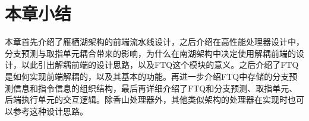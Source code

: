 









\section{本章小结}

本章首先介绍了雁栖湖架构的前端流水线设计，之后介绍在高性能处理器设计中，分支预测与取指单元耦合带来的影响，为什么在南湖架构中决定使用解耦前端的设计，以此引出解耦前端的设计思路，以及FTQ这个模块的意义。之后介绍了FTQ是如何实现前端解耦的，以及其基本的功能。再进一步介绍FTQ中存储的分支预测信息和指令信息的组织结构，最后再详细介绍了FTQ和分支预测、取指单元、后端执行单元的交互逻辑。除香山处理器外，其他类似架构的处理器在实现时也可以参考这种设计思路。
